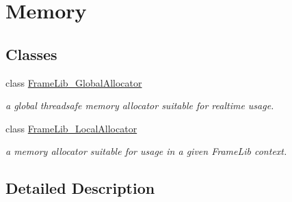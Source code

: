 \hypertarget{group___memory}{}\section{Memory}
\label{group___memory}
\subsection*{Classes}
\begin{DoxyCompactItemize}
\item 
class \hyperlink{class_frame_lib___global_allocator}{Frame\+Lib\+\_\+\+Global\+Allocator}
\begin{DoxyCompactList}\small\item\em a global threadsafe memory allocator suitable for realtime usage. \end{DoxyCompactList}\item 
class \hyperlink{class_frame_lib___local_allocator}{Frame\+Lib\+\_\+\+Local\+Allocator}
\begin{DoxyCompactList}\small\item\em a memory allocator suitable for usage in a given Frame\+Lib context. \end{DoxyCompactList}\end{DoxyCompactItemize}


\subsection{Detailed Description}
